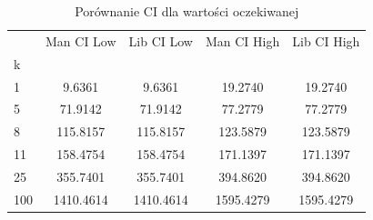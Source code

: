 \begin{table}[H]
\caption{Porównanie CI dla wartości oczekiwanej}
\label{tab:ci}
\begin{tabular}{lcccc}
\toprule
 & Man CI Low & Lib CI Low & Man CI High & Lib CI High \\
k &  &  &  &  \\
\midrule
1 & 9.6361 & 9.6361 & 19.2740 & 19.2740 \\
5 & 71.9142 & 71.9142 & 77.2779 & 77.2779 \\
8 & 115.8157 & 115.8157 & 123.5879 & 123.5879 \\
11 & 158.4754 & 158.4754 & 171.1397 & 171.1397 \\
25 & 355.7401 & 355.7401 & 394.8620 & 394.8620 \\
100 & 1410.4614 & 1410.4614 & 1595.4279 & 1595.4279 \\
\bottomrule
\end{tabular}
\end{table}
